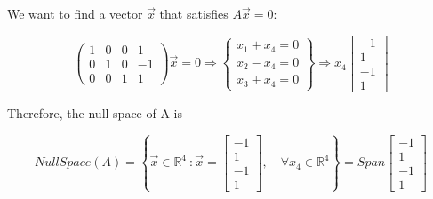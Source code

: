 \documentclass{article}
\newcommand{\R}{\mathbb{R}}
\begin{document}
\begin{enumerate}
    
    
    We want to find a vector $\vec{x}$ that satisfies $A\vec{x}=0:$
    
    \begin{equation*}
        \left(
            \begin{array}{rrrr}
                1 & 0 & 0 & 1 \\
                0 & 1 & 0 & -1 \\
                0 & 0 & 1 & 1 
            \end{array}
        \right)\vec{x}=0 \Longrightarrow  
        \left\{
            \begin{array}{r}
                x_1+x_4=0\\
                x_2-x_4=0\\
                x_3+x_4=0
            \end{array}
        \right\}
        \Longrightarrow 
        x_4 \left[
                \begin{array}{r}
                    -1\\
                    1\\
                    -1\\
                    1
                \end{array}
            \right]
    \end{equation*}
    
    Therefore, the null space of A is
    
    \begin{equation*}
        NullSpace\left(A\right) = \left\{ \vec{x} \in \R^4 \ : \vec{x} = \left[
            \begin{array}{r}
                -1\\
                1\\
                -1\\
                1
            \end{array}
        \right], \quad \forall x_4 \in \R^4 
        \right\} = Span\left[
                            \begin{array}{r}
                                -1\\
                                1\\
                                -1\\
                                1
                            \end{array}
                        \right]
    \end{equation*}
    

\end{enumerate}
\end{document}
